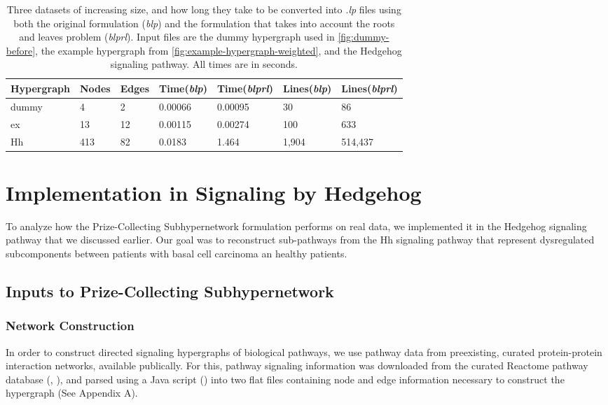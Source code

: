 \documentclass[12pt,twoside]{reedthesis}
\theoremstyle{definition}
\begin{document}
\begin{table}[!h]
\begin{center}
  \label{tab:build_lp_runtimes}
  \caption[Three datasets of increasing size.]{Three datasets of increasing size, and how long they take to be converted into \textit{.lp} files using both the original formulation (\textit{blp}) and the formulation that takes into account the roots and leaves problem (\textit{blprl}). Input files are the dummy hypergraph used in \ref{fig:dummy-before}, the example hypergraph from \ref{fig:example-hypergraph-weighted}, and the Hedgehog signaling pathway. All times are in seconds.}
\begin{tabular}{ |l||l|l|l|l|l|l| }%
  \hline%
  Hypergraph & Nodes & Edges & Time(\textit{blp}) & Time(\textit{blprl}) & Lines(\textit{blp}) & Lines(\textit{blprl}) \\%
  \hline \hline
  dummy & 4 & 2 & 0.00066 & 0.00095 & 30 & 86 \\ \hline%
  ex & 13 & 12 & 0.00115 & 0.00274 & 100 & 633 \\ \hline%
  Hh & 413 & 82 & 0.0183 & 1.464 & 1,904 & 514,437  \\ \hline%
\end{tabular}%
\end{center}
\end{table}


\chapter{Implementation in Signaling by Hedgehog}

To analyze how the Prize-Collecting Subhypernetwork formulation performs on real data, we implemented it in the Hedgehog signaling pathway that we discussed earlier. Our goal was to reconstruct sub-pathways from the Hh signaling pathway that represent dysregulated subcomponents between patients with basal cell carcinoma an healthy patients.

\section{Inputs to Prize-Collecting Subhypernetwork}

  \subsection{Network Construction}
  In order to construct directed signaling hypergraphs of biological pathways, we use pathway data from preexisting, curated protein-protein interaction networks, available publically. For this, pathway signaling information was downloaded from the curated Reactome pathway database (\cite{Croft2014}, \cite{Milacic2012}), and parsed using a Java script (\cite{AnnaCorrespondence}) into two flat files containing node and edge information necessary to construct the hypergraph (See Appendix A).\par
\end{document}
